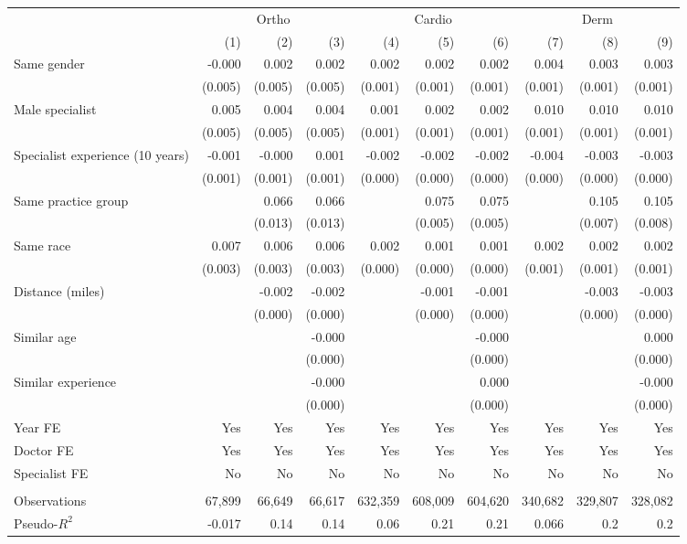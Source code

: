 \begin{tabular}{lrrrrrrrrr}
\toprule
\multicolumn{1}{c}{ } & \multicolumn{3}{c}{Ortho} & \multicolumn{3}{c}{Cardio} & \multicolumn{3}{c}{Derm} \\
\cmidrule(l{3pt}r{3pt}){2-4} \cmidrule(l{3pt}r{3pt}){5-7} \cmidrule(l{3pt}r{3pt}){8-10}
 & (1) & (2) & (3) & (4) & (5) & (6) & (7) & (8) & (9)\\
\midrule
Same gender & -0.000 & 0.002 & 0.002 & 0.002 & 0.002 & 0.002 & 0.004 & 0.003 & 0.003\\
 & (0.005) & (0.005) & \vphantom{1} (0.005) & (0.001) & (0.001) & \vphantom{1} (0.001) & (0.001) & (0.001) & \vphantom{2} (0.001)\\
Male specialist & 0.005 & 0.004 & 0.004 & 0.001 & 0.002 & 0.002 & 0.010 & 0.010 & 0.010\\
 & (0.005) & (0.005) & (0.005) & (0.001) & (0.001) & (0.001) & (0.001) & (0.001) & \vphantom{1} (0.001)\\
Specialist experience (10 years) & -0.001 & -0.000 & 0.001 & -0.002 & -0.002 & -0.002 & -0.004 & -0.003 & -0.003\\
 & (0.001) & (0.001) & (0.001) & (0.000) & (0.000) & \vphantom{1} (0.000) & (0.000) & (0.000) & (0.000)\\
Same practice group &  & 0.066 & 0.066 &  & 0.075 & 0.075 &  & 0.105 & 0.105\\
 &  & (0.013) & (0.013) &  & (0.005) & (0.005) &  & (0.007) & (0.008)\\
Same race & 0.007 & 0.006 & 0.006 & 0.002 & 0.001 & 0.001 & 0.002 & 0.002 & 0.002\\
 & (0.003) & (0.003) & (0.003) & (0.000) & (0.000) & (0.000) & (0.001) & (0.001) & (0.001)\\
Distance (miles) &  & -0.002 & -0.002 &  & -0.001 & -0.001 &  & -0.003 & -0.003\\
 &  & (0.000) & (0.000) &  & (0.000) & (0.000) &  & (0.000) & (0.000)\\
Similar age &  &  & -0.000 &  &  & -0.000 &  &  & 0.000\\
 &  &  & \vphantom{1} (0.000) &  &  & \vphantom{1} (0.000) &  &  & \vphantom{1} (0.000)\\
Similar experience &  &  & -0.000 &  &  & 0.000 &  &  & -0.000\\
 &  &  & (0.000) &  &  & (0.000) &  &  & (0.000)\\
\midrule
Year FE & Yes & Yes & Yes & Yes & Yes & Yes & Yes & Yes & Yes\\
Doctor FE & Yes & Yes & Yes & Yes & Yes & Yes & Yes & Yes & Yes\\
Specialist FE & No & No & No & No & No & No & No & No & No\\
\midrule\\
Observations & 67,899 & 66,649 & 66,617 & 632,359 & 608,009 & 604,620 & 340,682 & 329,807 & 328,082\\
Pseudo-$R^2$ & -0.017 & 0.14 & 0.14 & 0.06 & 0.21 & 0.21 & 0.066 & 0.2 & 0.2\\
\bottomrule
\end{tabular}
